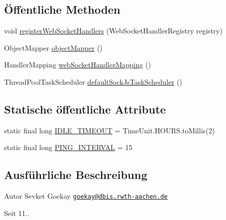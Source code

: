 \subsection*{Öffentliche Methoden}
\begin{DoxyCompactItemize}
\item 
void \hyperlink{classde_1_1rwth_1_1idsg_1_1steve_1_1config_1_1_web_socket_configuration_a5b9a235259f47b986eea0f931599700b}{register\+Web\+Socket\+Handlers} (Web\+Socket\+Handler\+Registry registry)
\item 
Object\+Mapper \hyperlink{classde_1_1rwth_1_1idsg_1_1steve_1_1config_1_1_web_socket_configuration_af0f897fbe1970c78fc61e476e50e8c6d}{object\+Mapper} ()
\item 
Handler\+Mapping \hyperlink{classde_1_1rwth_1_1idsg_1_1steve_1_1config_1_1_web_socket_configuration_ae4bdb11cf22e1d830dbde50f33f101aa}{web\+Socket\+Handler\+Mapping} ()
\item 
Thread\+Pool\+Task\+Scheduler \hyperlink{classde_1_1rwth_1_1idsg_1_1steve_1_1config_1_1_web_socket_configuration_a920d2f16bdc5ddc7e7805aec22e2faf5}{default\+Sock\+Js\+Task\+Scheduler} ()
\end{DoxyCompactItemize}
\subsection*{Statische öffentliche Attribute}
\begin{DoxyCompactItemize}
\item 
static final long \hyperlink{classde_1_1rwth_1_1idsg_1_1steve_1_1config_1_1_web_socket_configuration_a6a950c6ec954540c66dda295b8fb40b9}{I\+D\+L\+E\+\_\+\+T\+I\+M\+E\+O\+U\+T} = Time\+Unit.\+H\+O\+U\+R\+S.\+to\+Millis(2)
\item 
static final long \hyperlink{classde_1_1rwth_1_1idsg_1_1steve_1_1config_1_1_web_socket_configuration_aa11b5dc252d4aa2d65e849afe891c1d3}{P\+I\+N\+G\+\_\+\+I\+N\+T\+E\+R\+V\+A\+L} = 15
\end{DoxyCompactItemize}


\subsection{Ausführliche Beschreibung}
\begin{DoxyAuthor}{Autor}
Sevket Goekay \href{mailto:goekay@dbis.rwth-aachen.de}{\tt goekay@dbis.\+rwth-\/aachen.\+de} 
\end{DoxyAuthor}
\begin{DoxySince}{Seit}
11.. 
\end{DoxySince}


